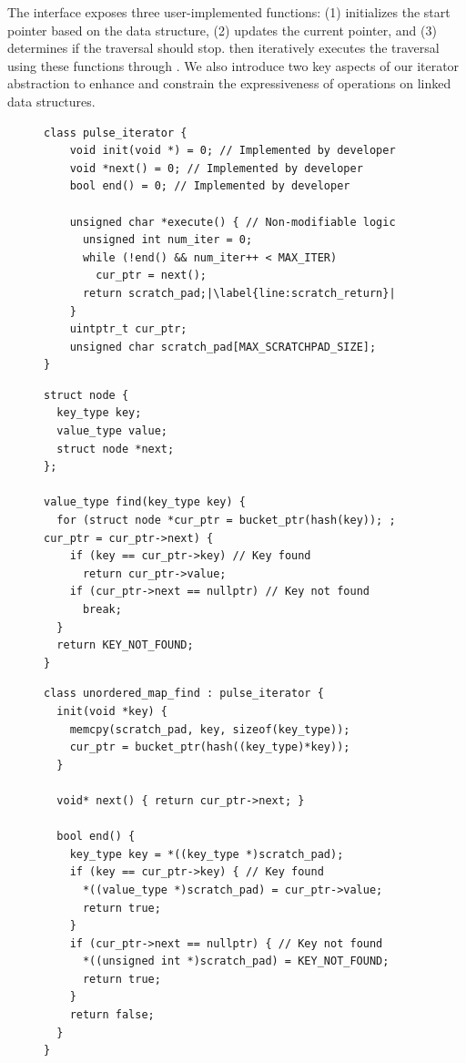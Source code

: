 The interface exposes three user-implemented functions: (1)  initializes the start pointer based on the data structure, (2)  updates the current pointer, and (3)  determines if the traversal should stop. \pulse then iteratively executes the traversal using these functions through . We also introduce two key aspects of our iterator abstraction to enhance and constrain the expressiveness of operations on linked data structures.

\begin{figure}[th]
\centering
\begin{lstlisting}[caption={\pulse interface.},label={lst:iterator},escapechar=|,basicstyle=\footnotesize,linewidth=\linewidth]
class pulse_iterator {
    void init(void *) = 0; // Implemented by developer
    void *next() = 0; // Implemented by developer
    bool end() = 0; // Implemented by developer
    
    unsigned char *execute() { // Non-modifiable logic
      unsigned int num_iter = 0;
      while (!end() && num_iter++ < MAX_ITER)
        cur_ptr = next();
      return scratch_pad;|\label{line:scratch_return}|
    }
    uintptr_t cur_ptr;
    unsigned char scratch_pad[MAX_SCRATCHPAD_SIZE];
}
\end{lstlisting}
\end{figure}

\begin{figure}[th]
\centering
\begin{lstlisting}[caption={C++ STL realization for \code{unordered\_map::find()}.},label={lst:stl},escapechar=|,basicstyle=\footnotesize,linewidth=\linewidth]
struct node {
  key_type key;
  value_type value;
  struct node *next;
};

value_type find(key_type key) {
  for (struct node *cur_ptr = bucket_ptr(hash(key)); ; cur_ptr = cur_ptr->next) {
    if (key == cur_ptr->key) // Key found
      return cur_ptr->value;
    if (cur_ptr->next == nullptr) // Key not found
      break;
  }
  return KEY_NOT_FOUND;
}
\end{lstlisting}
\begin{lstlisting}[caption={\pulse realization for \code{unordered\_map::find()}.},label={lst:stl_mod},escapechar=|,basicstyle=\footnotesize,linewidth=\linewidth]
class unordered_map_find : pulse_iterator {
  init(void *key) {
    memcpy(scratch_pad, key, sizeof(key_type));
    cur_ptr = bucket_ptr(hash((key_type)*key));
  }
  
  void* next() { return cur_ptr->next; }
  
  bool end() {
    key_type key = *((key_type *)scratch_pad);
    if (key == cur_ptr->key) { // Key found
      *((value_type *)scratch_pad) = cur_ptr->value;
      return true;
    }
    if (cur_ptr->next == nullptr) { // Key not found
      *((unsigned int *)scratch_pad) = KEY_NOT_FOUND;  
      return true;
    }
    return false;
  }
}
\end{lstlisting}
\end{figure}
  
